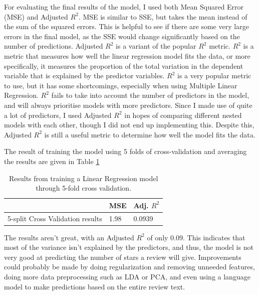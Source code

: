 For evaluating the final results of the model, I used both Mean Squared Error (MSE) and Adjusted $R^2$. MSE is similar to SSE, but takes the mean instead of the sum of the squared errors. This is helpful to see if there are some very large errors in the final model, as the SSE would change significantly based on the number of predictions. Adjusted $R^2$ is a variant of the popular $R^2$ metric. $R^2$ is a metric that measures how well the linear regression model fits the data, or more specifically, it measures the proportion of the total variation in the dependent variable that is explained by the predictor variables. $R^2$ is a very popular metric to use, but it has some shortcomings, especially when using Multiple Linear Regression. $R^2$ fails to take into account the number of predictors in the model, and will always prioritise models with more predictors. Since I made use of quite a lot of predictors, I used Adjusted $R^2$ in hopes of comparing different nested models with each other, though I did not end up implementing this. Despite this, Adjusted $R^2$ is still a useful metric to determine how well the model fits the data.

The result of training the model using 5 folds of cross-validation and averaging the results are given in Table \ref{table:mlresults}

\begin{table}[]
    \centering
    \begin{tabular}{|l|l|l|}
        \hline
                                 & MSE & Adj. $R^2$ \\ \hline
5-split Cross Validation results & 1.98 & 0.0939 \\ \hline
    \end{tabular}
    \caption{Results from training a Linear Regression model through 5-fold cross validation.}
    \label{table:mlresults}
\end{table}

The results aren't great, with an Adjusted $R^2$ of only 0.09. This indicates that most of the variance isn't explained by the predictors, and thus, the model is not very good at predicting the number of stars a review will give. Improvements could probably be made by doing regularization and removing unneeded features, doing more data preprocessing such as LDA or PCA, and even using a language model to make predictions based on the entire review text.